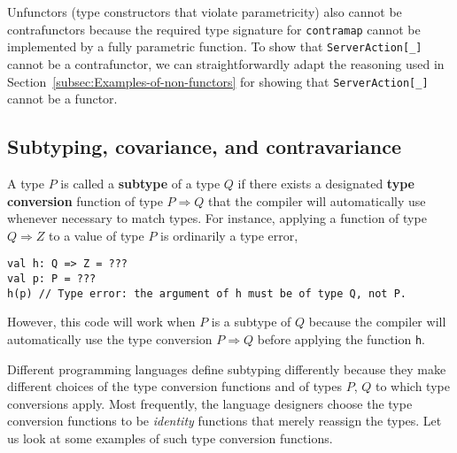Unfunctors (type constructors that violate parametricity)
also cannot be contrafunctors because the required type signature
for \lstinline!contramap! cannot be implemented by a fully parametric
function. To show that \lstinline!ServerAction[_]! cannot be a contrafunctor,
we can straightforwardly adapt the reasoning used in Section~\ref{subsec:Examples-of-non-functors}
for showing that \lstinline!ServerAction[_]! cannot be a functor.

\subsection{Subtyping, covariance, and contravariance}

A type $P$ is called a \textbf{subtype} of
a type $Q$ if there exists a designated
\textbf{type conversion} function of type $P\Rightarrow Q$ that the
compiler will automatically use whenever necessary to match types.
For instance, applying a function of type $Q\Rightarrow Z$ to a value
of type $P$ is ordinarily a type error,
\begin{lstlisting}
val h: Q => Z = ???
val p: P = ???
h(p) // Type error: the argument of h must be of type Q, not P.
\end{lstlisting}
However, this code will work when $P$ is a subtype of $Q$ because
the compiler will automatically use the type conversion $P\Rightarrow Q$
before applying the function \lstinline!h!.

Different programming languages define subtyping differently because
they make different choices of the type conversion functions and of
types $P$, $Q$ to which type conversions apply. Most frequently,
the language designers choose the type conversion functions to be
\emph{identity} functions that merely reassign the types. Let us look
at some examples of such type conversion functions. 

